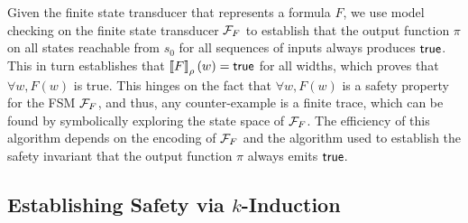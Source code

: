 Given the finite state transducer that represents a formula $F$,
we use model checking on the finite state transducer $\mathcal F_F$ to establish that the
output function $\pi$ on all states reachable from $s_0$ for all sequences of inputs always produces $\mathsf{true}$.
This in turn establishes that $\left\llbracket F \right\rrbracket_\rho(w) = \mathsf{true}$ for all widths,
which proves that $\forall w, F(w)$ is true.
This hinges on the fact that $\forall w, F(w)$ is a safety property for the FSM
$\mathcal F_F$, and thus, any counter-example is a finite trace, which can be found by
symbolically exploring the state space of $\mathcal F_F$. The efficiency of this
algorithm depends on the encoding of $\mathcal F_F$ and the algorithm used to establish
the safety invariant that the output function $\pi$ always emits $\mathsf{true}$.

\subsection{Establishing Safety via \texorpdfstring{$k$}{k}-Induction}

